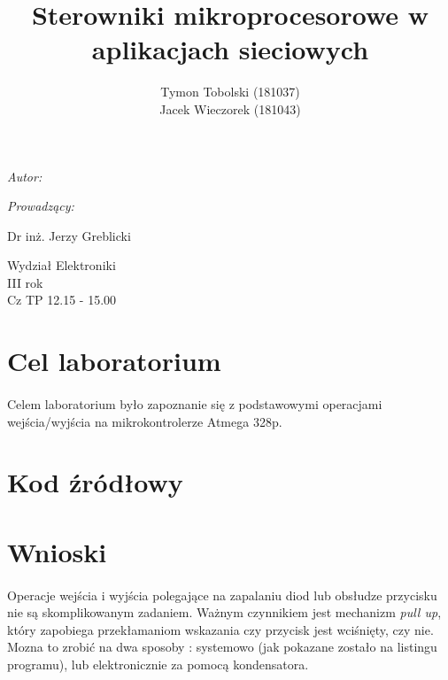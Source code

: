 \documentclass[wide,a4paper,titlepage,12pt] {article}
\title{Sterowniki mikroprocesorowe w aplikacjach sieciowych}
\author{Tymon Tobolski (181037)\\ Jacek Wieczorek (181043)}
\makeatletter
\renewcommand{\maketitle}{
\begin{titlepage}
  \begin{center}
    \vspace*{3cm}
    \LARGE \@title \par
    \vspace{2cm}
    \textit{\small Autor:}\par
    \normalsize \@author\par \normalsize
    \vspace{3cm}
    \textit{\small Prowadzący:}\par
    Dr inż. Jerzy Greblicki \par
    \vspace{2cm}
    Wydział Elektroniki\\ III rok\\ Cz TP 12.15 - 15.00\par

  \end{center}
\end{titlepage}
}
\makeatother
\begin{document}
\maketitle
  \section{Cel laboratorium}
  \paragraph{}
  Celem laboratorium było zapoznanie się z podstawowymi operacjami wejścia/wyjścia na mikrokontrolerze Atmega 328p.

  \section{Kod źródłowy}
  

  \section{Wnioski}
  \paragraph{}
  Operacje wejścia i wyjścia polegające na zapalaniu diod lub obsłudze przycisku nie są skomplikowanym zadaniem.
  Ważnym czynnikiem jest mechanizm \textit{pull up}, który zapobiega przekłamaniom wskazania czy przycisk jest wciśnięty, czy nie. Mozna to zrobić na dwa sposoby : systemowo (jak pokazane zostało na listingu programu), lub elektronicznie za pomocą kondensatora.
\end{document}
